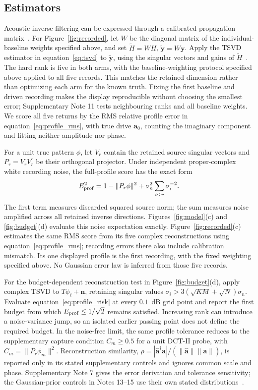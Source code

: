 \documentclass[lineno,pdflatex,sn-nature]{sn-jnl}%
\theoremstyle{thmstyleone}%
\theoremstyle{thmstyletwo}%
\theoremstyle{thmstylethree}%
\begin{document}
\subsection{Estimators}

Acoustic inverse filtering can be expressed through a calibrated propagation matrix~\cite{tanter2000}. For Figure~\ref{fig:recorded}, let $W$ be the diagonal matrix of the individual-baseline weights specified above, and set $\widetilde H=WH$, $\widetilde{\mathbf y}=W\mathbf y$. Apply the TSVD estimator in equation~\eqref{eq:tsvd} to $\widetilde{\mathbf y}$, using the singular vectors and gains of $\widetilde H$~\cite{hansen2010}. The hard rank is five in both arms, with the baseline-weighting protocol specified above applied to all five records. This matches the retained dimension rather than optimizing each arm for the known truth. Fixing the first baseline and driven recording makes the display reproducible without choosing the smallest error; Supplementary Note 11 tests neighbouring ranks and all baseline weights. We score all five returns by the RMS relative profile error in equation~\eqref{eq:profile_rms}, with true drive $\mathbf a_0$, counting the imaginary component and fitting neither amplitude nor phase.


For a unit true pattern $\phi$, let $V_r$ contain the retained source singular vectors and $P_r=V_rV_r^\dagger$ be their orthogonal projector. Under independent proper-complex white recording noise, the full-profile score has the exact form
\begin{equation}
 E_{\rm prof}^2=1-\|P_r\phi\|^2+\sigma_n^2\sum_{i\le r}\sigma_i^{-2}.
 \label{eq:profile_risk}
\end{equation}
The first term measures discarded squared source norm; the sum measures noise amplified across all retained inverse directions. Figures~\ref{fig:model}(c) and \ref{fig:budget}(d) evaluate this noise expectation exactly. Figure~\ref{fig:recorded}(c) estimates the same RMS score from its five complex reconstructions using equation~\eqref{eq:profile_rms}; recording errors there also include calibration mismatch. Its one displayed profile is the first recording, with the fixed weighting specified above. No Gaussian error law is inferred from those five records.


For the budget-dependent reconstruction test in Figure~\ref{fig:budget}(d), apply complex TSVD to $T\phi_\ell+\mathbf n$, retaining singular values $\sigma_i>3(\sqrt{KM}+\sqrt N)\sigma_n$. Evaluate equation~\eqref{eq:profile_risk} at every $0.1$~dB grid point and report the first budget from which $E_{\rm prof}\le1/\sqrt2$ remains satisfied. Increasing rank can introduce a noise-variance jump, so an isolated earlier passing point does not define the required budget. In the noise-free limit, the same profile tolerance reduces to the supplementary capture condition $C_m\geq0.5$ for a unit DCT-II probe, with $C_m=\|P_r\phi_m\|^2$. Reconstruction similarity, $\rho=|\hat{\mathbf a}^\dagger\mathbf a|/(\|\hat{\mathbf a}\|\|\mathbf a\|)$, is reported only in its stated supplementary controls and ignores common scale and phase. Supplementary Note 7 gives the error derivation and tolerance sensitivity; the Gaussian-prior controls in Notes 13--15 use their own stated distributions~\cite{rodgers2000}.
\end{document}
